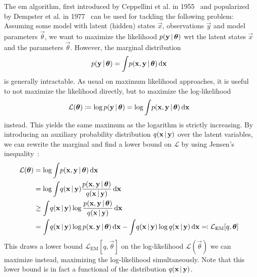 	The \ac{em} algorithm, first introduced by Ceppellini et al. in 1955~\cite{ceppelliniEstimationGeneFrequencies1955} and popularized by Dempster et al. in 1977~\cite{dempsterMaximumLikelihoodIncomplete1977a} can be used for tackling the following problem: Assuming some model with latent (hidden) states \(\vec{x}\), observations \(\vec{y}\) and model parameters \(\vec{\theta}\), we want to maximize the likelihood \( p(\boldsymbol{\mathrm{y}} \,\vert\, \boldsymbol{\mathrm{\theta}}) \) \ac{wrt} the latent states \(\vec{x}\) and the parameters \(\vec{\theta}\). However, the marginal distribution
	\begin{align*}
		p(\boldsymbol{\mathrm{y}} \,\vert\, \boldsymbol{\mathrm{\theta}}) = \int\! p(\boldsymbol{\mathrm{x}}, \boldsymbol{\mathrm{y}} \,\vert\, \boldsymbol{\mathrm{\theta}}) \dd{\boldsymbol{\mathrm{x}}}
	\end{align*}
	is generally intractable. As usual on maximum likelihood approaches, it is useful to not maximize the likelihood directly, but to maximize the log-likelihood
	\begin{align*}
		\mathcal{L}(\boldsymbol{\mathrm{\theta}}) \coloneqq \log p(\boldsymbol{\mathrm{y}} \,\vert\, \boldsymbol{\mathrm{\theta}}) = \log \int\! p(\boldsymbol{\mathrm{x}}, \boldsymbol{\mathrm{y}} \,\vert\, \boldsymbol{\mathrm{\theta}}) \dd{\boldsymbol{\mathrm{x}}}
	\end{align*}
	instead. This yields the same maximum as the logarithm is strictly increasing. By introducing an auxiliary probability distribution \( q(\boldsymbol{\mathrm{x}} \,\vert\, \boldsymbol{\mathrm{y}}) \) over the latent variables, we can rewrite the marginal and find a lower bound on \(\mathcal{L}\) by using Jensen's inequality~\cite{jensenFonctionsConvexesInegalites1906}:
	\begin{align}
		\mathcal{L}(\boldsymbol{\mathrm{\theta}})
			&= \log \int\! p(\boldsymbol{\mathrm{x}}, \boldsymbol{\mathrm{y}} \,\vert\, \boldsymbol{\mathrm{\theta}}) \dd{\boldsymbol{\mathrm{x}}}  \nonumber \\
			&= \log \int\! q(\boldsymbol{\mathrm{x}} \,\vert\, \boldsymbol{\mathrm{y}}) \frac{p(\boldsymbol{\mathrm{x}}, \boldsymbol{\mathrm{y}} \,\vert\, \boldsymbol{\mathrm{\theta}})}{q(\boldsymbol{\mathrm{x}} \,\vert\, \boldsymbol{\mathrm{y}})} \dd{\boldsymbol{\mathrm{x}}}  \nonumber \\
			&\geq \int\! q(\boldsymbol{\mathrm{x}} \,\vert\, \boldsymbol{\mathrm{y}}) \log \frac{p(\boldsymbol{\mathrm{x}}, \boldsymbol{\mathrm{y}} \,\vert\, \boldsymbol{\mathrm{\theta}})}{q(\boldsymbol{\mathrm{x}} \,\vert\, \boldsymbol{\mathrm{y}})} \dd{\boldsymbol{\mathrm{x}}}  \nonumber \\
			&= \int\! q(\boldsymbol{\mathrm{x}} \,\vert\, \boldsymbol{\mathrm{y}}) \log p(\boldsymbol{\mathrm{x}}, \boldsymbol{\mathrm{y}} \,\vert\, \boldsymbol{\mathrm{\theta}}) \dd{\boldsymbol{\mathrm{x}}} - \int\! q(\boldsymbol{\mathrm{x}} \,\vert\, \boldsymbol{\mathrm{y}}) \log q(\boldsymbol{\mathrm{x}} \,\vert\, \boldsymbol{\mathrm{y}}) \dd{\boldsymbol{\mathrm{x}}} \eqqcolon \mathcal{L}_\mathrm{EM}[q, \boldsymbol{\mathrm{\theta}}]  \label{eq:emLowerBound}
	\end{align}
	This draws a lower bound \( \mathcal{L}_\mathrm{EM}[q, \vec{\theta}] \) on the log-likelihood \( \mathcal{L}(\vec{\theta}) \) we can maximize instead, maximizing the log-likelihood simultaneously. Note that this lower bound is in fact a functional of the distribution \( q(\boldsymbol{\mathrm{x}} \,\vert\, \boldsymbol{\mathrm{y}}) \).


